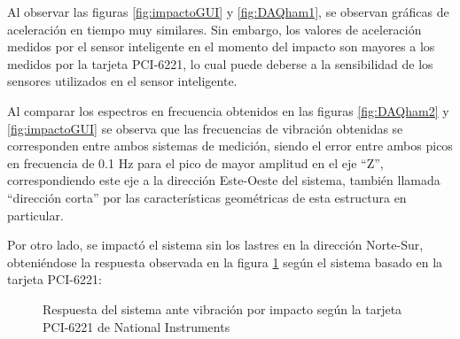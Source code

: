 Al observar las figuras \ref{fig:impactoGUI} y \ref{fig:DAQham1}, se observan gráficas de aceleración en tiempo muy similares. Sin embargo, los valores de aceleración medidos por el sensor inteligente en el momento del impacto son mayores a los medidos por la tarjeta PCI-6221, lo cual puede deberse a la sensibilidad de los sensores utilizados en el sensor inteligente.

Al comparar los espectros en frecuencia obtenidos en las figuras \ref{fig:DAQham2} y \ref{fig:impactoGUI} se observa que las frecuencias de vibración obtenidas se corresponden entre ambos sistemas de medición, siendo el error entre ambos picos en frecuencia de 0.1 Hz para el pico de mayor amplitud en el eje ``Z'', correspondiendo este eje a la dirección Este-Oeste del sistema, también llamada ``dirección corta'' por las características geométricas de esta estructura en particular.

Por otro lado, se impactó el sistema sin los lastres en la dirección Norte-Sur, obteniéndose la respuesta observada en la figura \ref{fig:DAQHammerNS} según el sistema basado en la tarjeta PCI-6221:

\begin{figure}[H]
    \centering
    \hfill
    \caption{Respuesta del sistema ante vibración por impacto según la tarjeta PCI-6221 de National Instruments}
    \label{fig:DAQHammerNS}
\end{figure}

